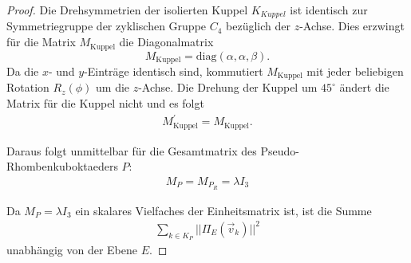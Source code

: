 \begin{proof}
    

    Die Drehsymmetrien der isolierten Kuppel $K_{Kuppel}$ ist identisch zur Symmetriegruppe der zyklischen Gruppe $C_{4}$ bezüglich der $z$-Achse. Dies erzwingt für die Matrix $M_{\text{Kuppel}}$ die Diagonalmatrix $$M_{\text{Kuppel}} = \text{diag}(\alpha, \alpha, \beta).$$ Da die $x$- und $y$-Einträge identisch sind, kommutiert $M_{\text{Kuppel}}$ mit jeder beliebigen Rotation $R_z(\phi)$ um die $z$-Achse. Die Drehung der Kuppel um $45^\circ$ ändert die Matrix für die Kuppel nicht und es folgt
    \begin{align}
       M^{'}_{\text{Kuppel}} = M_{\text{Kuppel}}. \nonumber
    \end{align}
    
    Daraus folgt unmittelbar für die Gesamtmatrix des Pseudo-Rhombenkuboktaeders $P$:
    \begin{align}
        M_P = M_{P_R} = \lambda I_3 \nonumber
    \end{align}
    
    Da $M_P = \lambda I_3$ ein skalares Vielfaches der Einheitsmatrix ist, ist die Summe
    \begin{align}
        \sum_{k \in K_P} ||\Pi_E(\vec{v}_k)||^2  \nonumber
    \end{align}
    unabhängig von der Ebene $E$.
\end{proof}

\newpage

\newpage

% 
